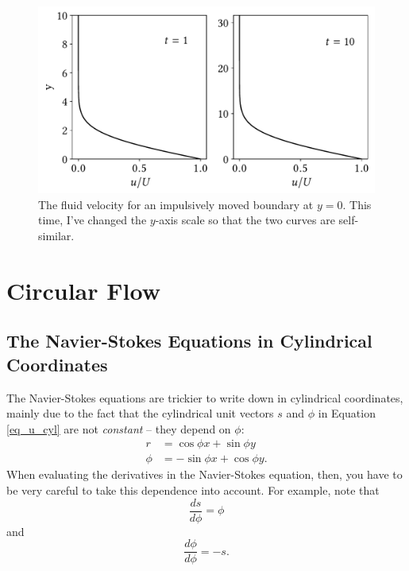 \begin{figure}
\centering
\includegraphics[width=0.8\linewidth]{Figures/Chapter2/fig_ss_vel2}
\caption{The fluid velocity for an impulsively moved boundary at $y=0$.  This time, I've changed the $y$-axis scale so that the two curves are self-similar. }
\label{fig_ss_vel2}
\end{figure}


%
% 

\section{Circular Flow}



\subsection{The Navier-Stokes Equations in Cylindrical Coordinates}
\label{sec_ns_cyl}

The Navier-Stokes equations are trickier to write down in cylindrical coordinates, mainly due to the fact that the cylindrical unit vectors $\unit{s}$ and $\unit{\phi}$ in Equation \ref{eq_u_cyl} are not \emph{constant} -- they depend on $\phi$:
\begin{align*}
\unit{r} & = \cos \phi \unit{x} + \sin \phi \unit{y} \\
\unit{\phi} & = - \sin \phi \unit{x} + \cos \phi \unit{y}.
\end{align*}
When evaluating the derivatives in the Navier-Stokes equation, then, you have to be very careful to take this dependence into account.  For example, note that
\[
\frac{d\unit{s}}{d\phi} = \unit{\phi}
\]
and
\[
\frac{d\unit{\phi}}{d\phi} = - \unit{s}.
\]


